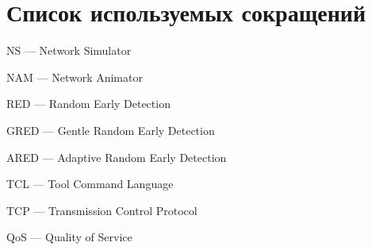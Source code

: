 \chapter*{Список используемых сокращений}

\mbox{}

NS --- Network Simulator

NAM --- Network Animator

RED --- Random Early Detection

GRED --- Gentle Random Early Detection

ARED --- Adaptive Random Early Detection

TCL --- Tool Command Language

TCP --- Transmission Control Protocol

QoS --- Quality of Service




